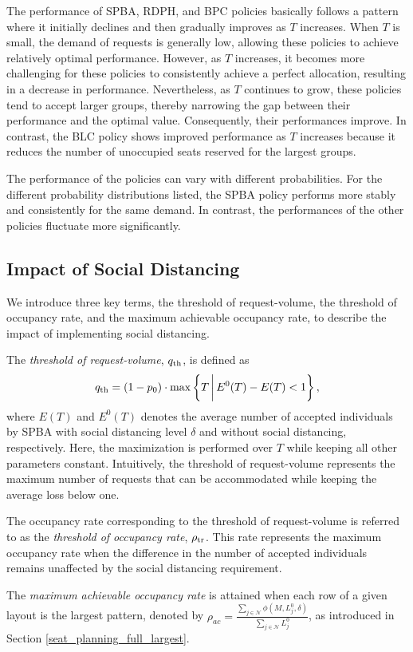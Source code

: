 The performance of SPBA, RDPH, and BPC policies basically follows a pattern where it initially declines and then gradually improves as $T$ increases. When $T$ is small, the demand of requests is generally low, allowing these policies to achieve relatively optimal performance. However, as $T$ increases, it becomes more challenging for these policies to consistently achieve a perfect allocation, resulting in a decrease in performance. Nevertheless, as $T$ continues to grow, these policies tend to accept larger groups, thereby narrowing the gap between their performance and the optimal value. Consequently, their performances improve. In contrast, the BLC policy shows improved performance as $T$ increases because it reduces the number of unoccupied seats reserved for the largest groups. 

The performance of the policies can vary with different probabilities. For the different probability distributions listed, the SPBA policy performs more stably and consistently for the same demand. In contrast, the performances of the other policies fluctuate more significantly.


\subsection{Impact of Social Distancing}\label{impact_sd}
We introduce three key terms, the threshold of request-volume, the threshold of occupancy rate, and the maximum achievable occupancy rate, to describe the impact of implementing social distancing.

The \textit{threshold of request-volume}, ${q}_{\textup{th}}$, is defined as 
\[
{q}_{\textup{th}} = (1- p_0) \cdot \max\left\{T \,\bigg|\, E^{0}(T) - E(T) < 1\right\},
\]
where $E(T)$ and $E^{0}(T)$ denotes the average number of accepted individuals by SPBA with social distancing level $\delta$ and without social distancing, respectively. Here, the maximization is performed over $T$ while keeping all other parameters constant.
Intuitively, the threshold of request-volume represents the maximum number of requests that can be accommodated while keeping the average loss below one.


The occupancy rate corresponding to the threshold of request-volume is referred to as the \textit{threshold of occupancy rate}, $\rho_{\textup{tr}}$. This rate represents the maximum occupancy rate when the difference in the number of accepted individuals remains unaffected by the social distancing requirement.

The \textit{maximum achievable occupancy rate} is attained when each row of a given layout is the largest pattern, denoted by $\rho_{ac} = \frac{\sum_{j \in \mathcal{N}}\phi(M, L_{j}^{0}, \delta)}{\sum_{j \in \mathcal{N}} L_{j}^{0}}$, as introduced in Section \ref{seat_planning_full_largest}.


